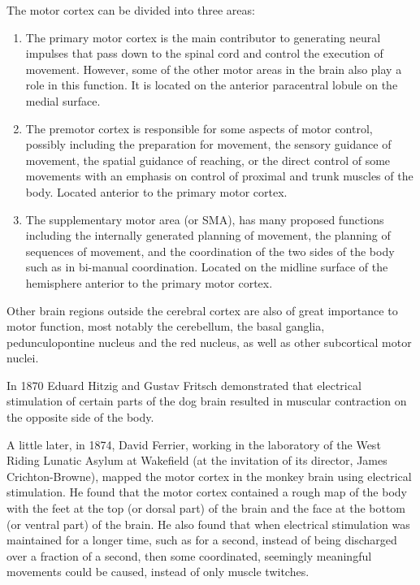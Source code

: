 The motor cortex can be divided into three areas:

\begin{enumerate}
\def\labelenumi{\arabic{enumi}.}
\tightlist
\item
  The primary motor cortex is the main contributor to generating neural
  impulses that pass down to the spinal cord and control the execution
  of movement. However, some of the other motor areas in the brain also
  play a role in this function. It is located on the anterior
  paracentral lobule on the medial surface.
\item
  The premotor cortex is responsible for some aspects of motor control,
  possibly including the preparation for movement, the sensory guidance
  of movement, the spatial guidance of reaching, or the direct control
  of some movements with an emphasis on control of proximal and trunk
  muscles of the body. Located anterior to the primary motor cortex.
\item
  The supplementary motor area (or SMA), has many proposed functions
  including the internally generated planning of movement, the planning
  of sequences of movement, and the coordination of the two sides of the
  body such as in bi-manual coordination. Located on the midline surface
  of the hemisphere anterior to the primary motor cortex.
\end{enumerate}

Other brain regions outside the cerebral cortex are also of great
importance to motor function, most notably the cerebellum, the basal
ganglia, pedunculopontine nucleus and the red nucleus, as well as other
subcortical motor nuclei.

In 1870 Eduard Hitzig and Gustav Fritsch demonstrated that electrical
stimulation of certain parts of the dog brain resulted in muscular
contraction on the opposite side of the body.

A little later, in 1874, David Ferrier, working in the laboratory of the
West Riding Lunatic Asylum at Wakefield (at the invitation of its
director, James Crichton-Browne), mapped the motor cortex in the monkey
brain using electrical stimulation. He found that the motor cortex
contained a rough map of the body with the feet at the top (or dorsal
part) of the brain and the face at the bottom (or ventral part) of the
brain. He also found that when electrical stimulation was maintained for
a longer time, such as for a second, instead of being discharged over a
fraction of a second, then some coordinated, seemingly meaningful
movements could be caused, instead of only muscle twitches.

